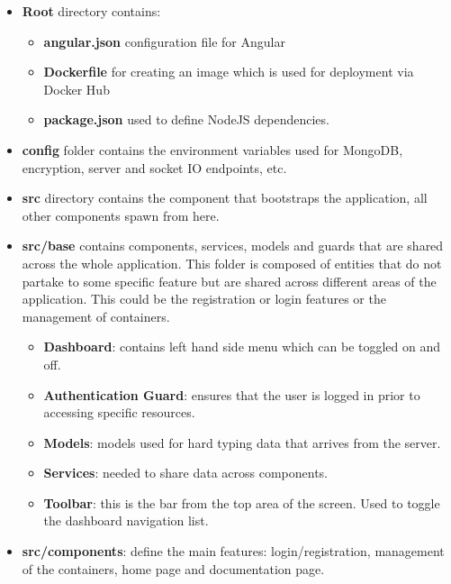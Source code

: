 \documentclass[multi, tikz, a4paper, oneside]{article}
\begin{document}
\begin{itemize}
  \item \textbf{Root} directory contains:
  \begin{itemize}
  \item \textbf{angular.json} configuration file for Angular
  \item \textbf{Dockerfile} for creating an image which is used for deployment
    via Docker Hub
  \item \textbf{package.json} used to define NodeJS dependencies.
  \end{itemize}
  \item \textbf{config} folder contains the environment variables used for
    MongoDB, encryption, server and socket IO endpoints, etc.
  \item \textbf{src} directory contains the component that bootstraps the
    application, all other components spawn from here.
  \item \textbf{src/base} contains components, services, models and guards that
    are shared across the whole application. This folder is composed of entities
    that do not partake to some specific feature but are shared across different
    areas of the application. This could be the registration or login features
    or the management of containers.
    \begin{itemize}
    \item \textbf{Dashboard}: contains left hand side menu which can be toggled on and
      off.
    \item \textbf{Authentication Guard}: ensures that the user is logged in prior to
      accessing specific resources.
    \item \textbf{Models}: models used for hard typing data that arrives from the server.
    \item \textbf{Services}: needed to share data across components.
    \item \textbf{Toolbar}: this is the bar from the top area of the screen. Used to
      toggle the dashboard navigation list.
    \end{itemize}
  \item \textbf{src/components}: define the main features: login/registration,
    management of the containers, home page and documentation page.
\end{itemize}
\end{document}
